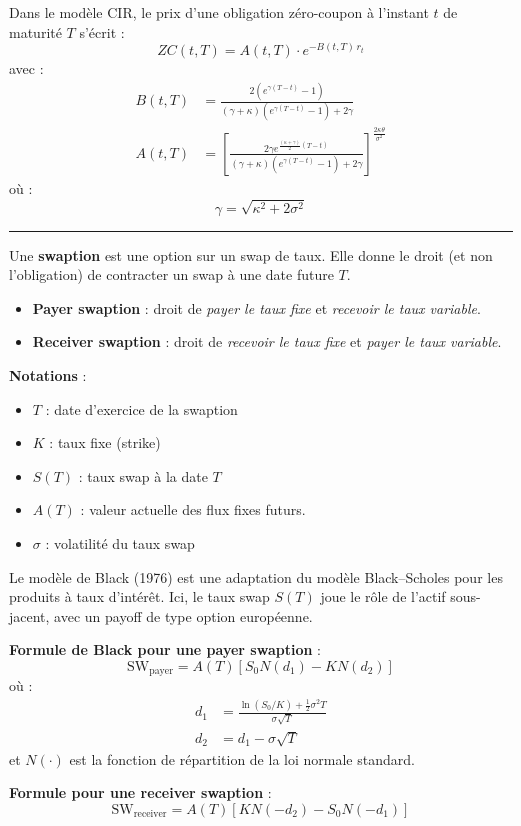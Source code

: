 \begin{f}
Dans le modèle CIR, le prix d’une obligation zéro-coupon à l’instant $t$ de maturité $T$ s’écrit :
\[
ZC(t, T) = A(t, T) \cdot e^{-B(t, T)\, r_t}
\]
avec :
\[
\begin{aligned}
	B(t, T) &= \frac{2 (e^{\gamma (T - t)} - 1)}{(\gamma + \kappa)(e^{\gamma (T - t)} - 1) + 2\gamma} \\
	A(t, T) &= \left[ \frac{2\gamma e^{\frac{(\kappa + \gamma)}{2}(T - t)}}{(\gamma + \kappa)(e^{\gamma (T - t)} - 1) + 2\gamma} \right]^{\frac{2\kappa\theta}{\sigma^2}}
\end{aligned}
\]
où :
\[
\gamma = \sqrt{\kappa^2 + 2\sigma^2}
\]

\end{f}
\hrule

\begin{f}

Une \textbf{swaption} est une option sur un swap de taux. Elle donne le droit (et non l'obligation) de contracter un swap à une date future $T$.

\begin{itemize}[nosep]
	\item \textbf{Payer swaption} : droit de \emph{payer le taux fixe} et \emph{recevoir le taux variable}.
	\item \textbf{Receiver swaption} : droit de \emph{recevoir le taux fixe} et \emph{payer le taux variable}.
\end{itemize}

\textbf{Notations} :
\begin{itemize}[nosep]
	\item $T$ : date d’exercice de la swaption
	\item $K$ : taux fixe (strike)
	\item $S(T)$ : taux swap à la date $T$
	\item $A(T)$ : valeur actuelle des flux fixes futurs.
	\item $\sigma$ : volatilité du taux swap
\end{itemize}

Le modèle de Black (1976) est une adaptation du modèle Black–Scholes pour les produits à taux d'intérêt. Ici, le taux swap $S(T)$ joue le rôle de l’actif sous-jacent, avec un payoff de type option européenne.

\textbf{Formule de Black pour une payer swaption} :
\[
\text{SW}_{\text{payer}} = A(T) \left[ S_0 N(d_1) - K N(d_2) \right]
\]
où :
\[
\begin{aligned}
	d_1 &= \frac{\ln(S_0 / K) + \frac{1}{2} \sigma^2 T}{\sigma \sqrt{T}} \\
	d_2 &= d_1 - \sigma \sqrt{T}
\end{aligned}
\]
et $N(\cdot)$ est la fonction de répartition de la loi normale standard.

\textbf{Formule pour une receiver swaption} :
\[
\text{SW}_{\text{receiver}} = A(T) \left[ K N(-d_2) - S_0 N(-d_1) \right]
\]

\end{f}

